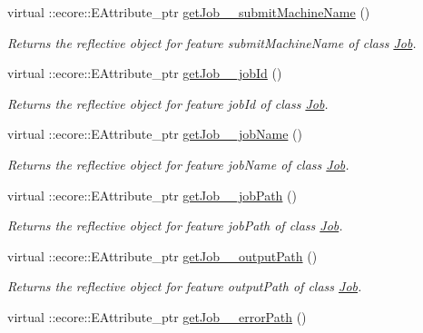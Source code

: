 \begin{DoxyCompactItemize}
virtual ::ecore::EAttribute\_\-ptr \hyperlink{classTMS__Data_1_1TMS__DataPackage_a46e6ed155461aea4143b2ce2f904beab}{getJob\_\-\_\-submitMachineName} ()
\begin{DoxyCompactList}\small\item\em Returns the reflective object for feature submitMachineName of class \hyperlink{classTMS__Data_1_1Job}{Job}. \item\end{DoxyCompactList}\item 
virtual ::ecore::EAttribute\_\-ptr \hyperlink{classTMS__Data_1_1TMS__DataPackage_a5c9befaf86fdc2a4266711ffb5be65d2}{getJob\_\-\_\-jobId} ()
\begin{DoxyCompactList}\small\item\em Returns the reflective object for feature jobId of class \hyperlink{classTMS__Data_1_1Job}{Job}. \item\end{DoxyCompactList}\item 
virtual ::ecore::EAttribute\_\-ptr \hyperlink{classTMS__Data_1_1TMS__DataPackage_afe2986e05bcacb3e970e8ed6253d1860}{getJob\_\-\_\-jobName} ()
\begin{DoxyCompactList}\small\item\em Returns the reflective object for feature jobName of class \hyperlink{classTMS__Data_1_1Job}{Job}. \item\end{DoxyCompactList}\item 
virtual ::ecore::EAttribute\_\-ptr \hyperlink{classTMS__Data_1_1TMS__DataPackage_a847ee964501b7e56da7c8aa00ecb90fd}{getJob\_\-\_\-jobPath} ()
\begin{DoxyCompactList}\small\item\em Returns the reflective object for feature jobPath of class \hyperlink{classTMS__Data_1_1Job}{Job}. \item\end{DoxyCompactList}\item 
virtual ::ecore::EAttribute\_\-ptr \hyperlink{classTMS__Data_1_1TMS__DataPackage_ad349d7d68848a394750da41de07ebbd8}{getJob\_\-\_\-outputPath} ()
\begin{DoxyCompactList}\small\item\em Returns the reflective object for feature outputPath of class \hyperlink{classTMS__Data_1_1Job}{Job}. \item\end{DoxyCompactList}\item 
virtual ::ecore::EAttribute\_\-ptr \hyperlink{classTMS__Data_1_1TMS__DataPackage_ab6e8955c92b3783b748e1a3d698dc5cf}{getJob\_\-\_\-errorPath} ()

\end{DoxyCompactItemize}
